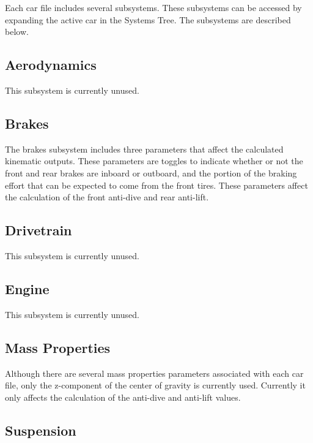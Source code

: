 Each car file includes several subsystems.  These subsystems can be accessed by expanding the active car in the Systems Tree.  The subsystems are described below.

\subsection{Aerodynamics} \label{ssec:aerodynamics}

This subsystem is currently unused.

\subsection{Brakes} \label{ssec:brakes}

The brakes subsystem includes three parameters that affect the calculated kinematic outputs.  These parameters are toggles to indicate whether or not the front and rear brakes are inboard or outboard, and the portion of the braking effort that can be expected to come from the front tires.  These parameters affect the calculation of the front anti-dive and rear anti-lift.

\subsection{Drivetrain} \label{ssec:drivetrain}

This subsystem is currently unused.

\subsection{Engine} \label{ssec:engine}

This subsystem is currently unused.

\subsection{Mass Properties} \label{ssec:massProperties}

Although there are several mass properties parameters associated with each car file, only the z-component of the center of gravity is currently used.  Currently it only affects the calculation of the anti-dive and anti-lift values.

\subsection{Suspension} \label{ssec:suspension}

